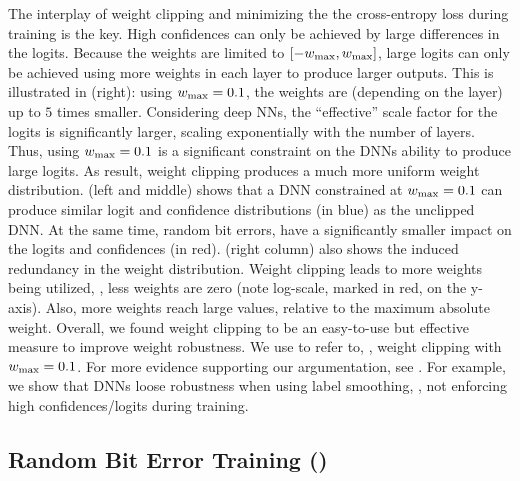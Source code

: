 The interplay of weight clipping and minimizing the the cross-entropy loss during training is the key. High confidences can only be achieved by large differences in the logits. Because the weights are limited to $[-\wmax, \wmax]$, large logits can only be achieved using more weights in each layer to produce larger outputs. This is illustrated in  (right): using $\wmax = 0.1$, the weights are (depending on the layer) up to $5$ times smaller. Considering deep NNs, the ``effective'' scale factor for the logits is significantly larger, scaling exponentially with the number of layers. Thus, using $\wmax = 0.1$ is a significant constraint on the DNNs ability to produce large logits. As result, weight clipping produces a much more uniform weight distribution.
 (left and middle) shows that a DNN constrained at $\wmax = 0.1$ can produce similar logit and confidence distributions (in {\color{colorbrewer2}blue}) as the unclipped DNN. At the same time, random bit errors, have a significantly smaller impact on the logits and confidences (in {\color{colorbrewer1}red}).  (right column) also shows the induced redundancy in the weight distribution. Weight clipping leads to more weights being utilized, \ie, less weights are zero (note log-scale, marked in {\color{colorbrewer1}red}, on the y-axis). Also, more weights reach large values, relative to the maximum absolute weight. Overall, we found weight clipping to be an easy-to-use but effective measure to improve weight robustness. We use \Clipping[$\wmax{=}0.1$] to refer to, \eg, weight clipping with $\wmax = 0.1$. For more evidence supporting our argumentation, see . For example, we show that DNNs loose robustness when using label smoothing, \ie, not enforcing high confidences/logits during training.

\subsection{Random Bit Error Training (\Random)}
\label{subsec:robustness-training}

